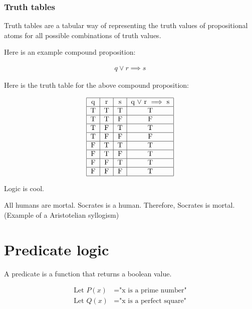 \documentclass{article}
\begin{document}
\subsubsection{Truth tables}

Truth tables are a tabular way of representing the truth values of propositional atoms for all possible combinations of truth values.

Here is an example compound proposition:

\begin{align*}
    q \lor r \implies s
\end{align*}

Here is the truth table for the above compound proposition:

\begin{align*}
    \begin{tabular}{|c|c|c|c|}
        \hline
        q & r & s & q $\lor$ r $\implies$ s \\
        \hline
        T & T & T & T                       \\
        \hline
        T & T & F & F                       \\
        \hline
        T & F & T & T                       \\
        \hline
        T & F & F & F                       \\
        \hline
        F & T & T & T                       \\
        \hline
        F & T & F & T                       \\
        \hline
        F & F & T & T                       \\
        \hline
        F & F & F & T                       \\
        \hline
    \end{tabular}
\end{align*}

Logic is cool.

All humans are mortal.
Socrates is a human.
Therefore, Socrates is mortal.
(Example of a Aristotelian syllogism)

\section{Predicate logic}

A predicate is a function that returns a boolean value.

\begin{align*}
    \text{Let } P(x) & = \text{"x is a prime number"}   \\
    \text{Let } Q(x) & = \text{"x is a perfect square"}
\end{align*}
\end{document}
